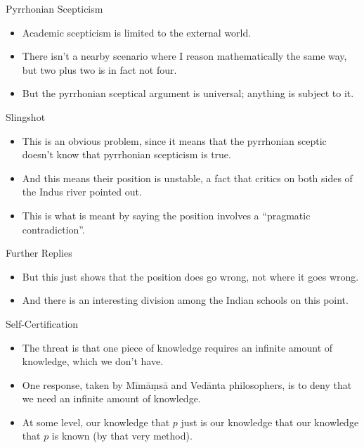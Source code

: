 \documentclass[
  17pt,
  letterpaper,
  ignorenonframetext,
  aspectratio=169,
]{beamer}
\providecommand{\tightlist}{%
  \setlength{\itemsep}{0pt}\setlength{\parskip}{0pt}}\usepackage{longtable,booktabs,array}
\begin{document}
\begin{frame}{Pyrrhonian Scepticism}
\protect\hypertarget{pyrrhonian-scepticism-1}{}
\begin{itemize}[<+->]
\tightlist
\item
  Academic scepticism is limited to the external world.
\item
  There isn't a nearby scenario where I reason mathematically the same
  way, but two plus two is in fact not four.
\item
  But the pyrrhonian sceptical argument is universal; anything is
  subject to it.
\end{itemize}
\end{frame}

\begin{frame}{Slingshot}
\protect\hypertarget{slingshot}{}
\begin{itemize}[<+->]
\tightlist
\item
  This is an obvious problem, since it means that the pyrrhonian sceptic
  doesn't know that pyrrhonian scepticism is true.
\item
  And this means their position is unstable, a fact that critics on both
  sides of the Indus river pointed out.
\item
  This is what is meant by saying the position involves a ``pragmatic
  contradiction''.
\end{itemize}
\end{frame}

\begin{frame}{Further Replies}
\protect\hypertarget{further-replies}{}
\begin{itemize}[<+->]
\tightlist
\item
  But this just shows that the position does go wrong, not where it goes
  wrong.
\item
  And there is an interesting division among the Indian schools on this
  point.
\end{itemize}
\end{frame}

\begin{frame}{Self-Certification}
\protect\hypertarget{self-certification}{}
\begin{itemize}[<+->]
\tightlist
\item
  The threat is that one piece of knowledge requires an infinite amount
  of knowledge, which we don't have.
\item
  One response, taken by Mīmāṃsā and Vedānta philosophers, is to deny
  that we need an infinite amount of knowledge.
\item
  At some level, our knowledge that \(p\) just is our knowledge that our
  knowledge that \(p\) is known (by that very method).
\end{itemize}
\end{frame}
\end{document}
